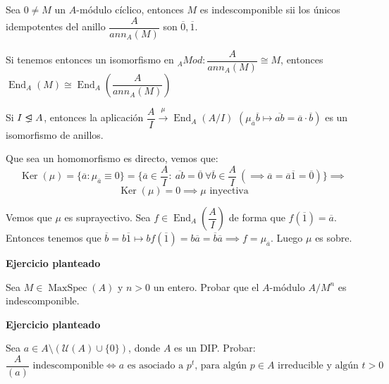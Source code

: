 \documentclass[openany]{book}
\begin{document}
\begin{lemma}
    Sea $ 0 \ne M$ un $ A$-módulo cíclico, entonces $ M$ es indescomponible sii los únicos idempotentes del anillo $ \dfrac{A}{an n_{A}(M)}$ son $ \overline{0},\overline{1}$.

    Si tenemos entonces un isomorfismo en $ _{A}Mod: \dfrac{A}{an n_{A}(M)}\cong M$, entonces $ \operatorname{End}_{A}(M) \cong \operatorname{End}_{A} \left( \dfrac{A}{an n_{A}(M)} \right)$

\end{lemma}


\begin{exercise}
    Si $ I \properideal A$, entonces la aplicación $ \dfrac{A}{I} \xrightarrow{\mu} \operatorname{End}_{A}(A/I)$ $ (\mu_{\overline{a}}\overline{b} \mapsto \overline{ab} = \overline{a}\cdot \overline{b})$ es un isomorfismo de anillos.

    Que sea un homomorfismo es directo, vemos que:
    $$ \operatorname{Ker}(\mu) = \{\overline{a}: \mu_{\overline{a}} \equiv 0\} = \{\overline{a} \in \dfrac{A}{I}:\ \overline{ab} = \overline{0}\ \forall \overline{b} \in \dfrac{A}{I}\ (\implies \overline{a} = \overline{a}\overline{1} = \overline{0})\} \implies $$
    $$ \operatorname{Ker}(\mu) = 0 \implies \mu \text{ inyectiva} $$

    Vemos que $ \mu$ es suprayectivo. Sea $ f \in \operatorname{End}_{A}\left(\dfrac{A}{I}\right)$ de forma que $ f(\overline{1}) = \overline{a}$. Entonces tenemos que $ \overline{b} = b \overline{1} \mapsto bf(\overline{1}) = b \overline{a} = \overline{b} \overline{a} \implies f = \mu_{\overline{a}}$. Luego $ \mu$ es sobre.
\end{exercise}


\begin{exercise}
    \textbf{Ejercicio planteado}    

    Sea $ M \in \operatorname{MaxSpec}(A)$ y $ n>0$ un entero. Probar que el $ A$-módulo $ A/M^{n}$ es indescomponible.
\end{exercise}

\begin{exercise}
    \textbf{Ejercicio planteado}

    Sea $ a \in A \setminus (\mathcal{U}(A) \cup \{0\})$, donde $ A$ es un DIP. Probar:
    $$ \dfrac{A}{(a)} \text{ indescomponible} \iff a\text{  es asociado a }p^{t}\text{, para algún }p \in A \text{ irreducible y algún } t>0 $$
\end{exercise}
\end{document}
